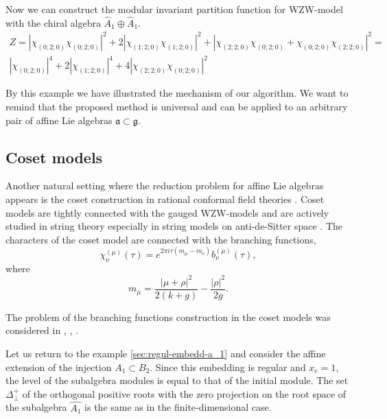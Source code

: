 \documentclass[a4paper,12pt]{article}
\theoremstyle{definition} \newtheorem{Def}{Definition}
\begin{document}
Now we can construct the modular invariant partition function for WZW-model with the chiral algebra $\hat{A}_1\oplus \hat{A}_1$.
\begin{multline}
  \label{eq:40}
  Z=\left|\chi_{(0;2;0)}\chi_{(0;2;0)}\right|^2+2\left|\chi_{(1;2;0)}\chi_{(1;2;0)}\right|^2+ \left|\chi_{(2;2;0)}\chi_{(0;2;0)}+\chi_{(0;2;0)}\chi_{(2;2;0)}\right|^2=\\
  \left|\chi_{(0;2;0)}\right|^4+2\left|\chi_{(1;2;0)}\right|^4+ 4\left|\chi_{(2;2;0)}\chi_{(0;2;0)}\right|^2
\end{multline}

By this example we have illustrated the mechanism of our algorithm.
We want to remind that the proposed method is universal and can be applied to
an arbitrary pair of affine Lie algebras $\mathfrak{a}\subset\mathfrak{g}$.

\subsection{Coset models}
\label{sec:coset-models}

Another natural setting where the reduction problem for affine Lie algebras appears is
the coset construction in rational conformal field theories \cite{Goddard198588}.
Coset models are tightly connected with the gauged WZW-models and are actively studied
in string theory especially in string models on anti-de-Sitter space
\cite{Maldacena:2000hw,Maldacena:2000kv,Maldacena:2001km,Maldacena:2001ky,Aharony:1999ti}.
The characters of the coset model are connected with the branching functions,
\begin{equation}
  \label{eq:31}
  \chi^{(\mu)}_{\nu}(\tau)=e^{2\pi i \tau (m_{\mu}-m_{\nu})} b^{(\mu)}_{\nu}(\tau),
\end{equation}
where
\begin{equation}
  \label{eq:46}
  m_{\mu}=\frac{\left|\mu+\rho\right|^2}{2(k+g)}-\frac{\left|\rho\right|^2}{2g}.
\end{equation}

The problem of the branching functions construction in the coset models was considered
in  \cite{Dunbar:1992gh}, \cite{Hwang:1994yr}, \cite{lu1994branching}.

Let us return to the example \ref{sec:regul-embedd-a_1} and consider the affine extension of the injection
$A_1\subset B_2$.
Since this embedding is regular and $x_e=1$, the level of the  subalgebra modules is equal to that of the initial module.
The set $\Delta^{+}_{\bot}$ of the orthogonal positive roots with the zero projection
on the root space of the subalgebra $\hat{A_1}$ is the same as in the finite-dimensional case.
\end{document}
